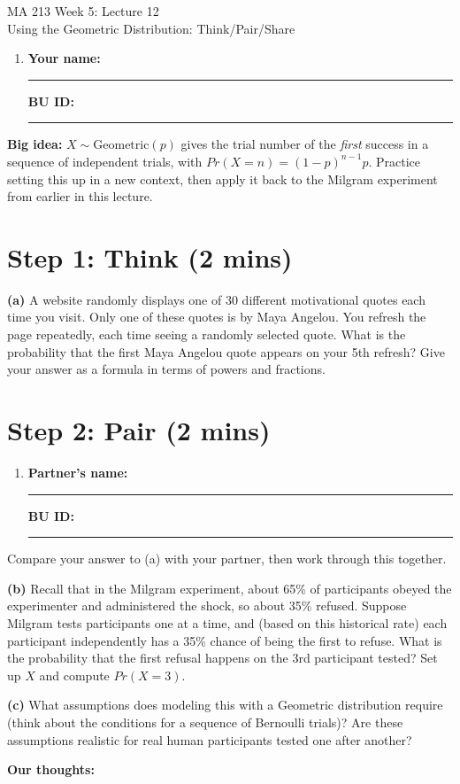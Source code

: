 \documentclass{article}
\newcommand{\coursenumber}{MA 213}
\newcommand{\weekplaceholder}{5}
\newcommand{\lectureplaceholder}{12}
\newcommand{\lecturetitle}{Using the Geometric Distribution: Think/Pair/Share}
\newcommand{\nameblank}{\rule{1.75in}{0.4pt}}
\newcommand{\idblank}{\rule{1.55in}{0.4pt}}
\begin{document}
\begin{center}
  {\LARGE \coursenumber{} Week \weekplaceholder{}: Lecture \lectureplaceholder{}}\\
  {\large \lecturetitle{}}
\end{center}

\begin{enumerate}[label=\arabic*.,leftmargin=*,itemsep=.7em]
  \item \textbf{Your name:} \nameblank \hfill \textbf{BU ID:} \idblank
\end{enumerate}

\textbf{Big idea:} $X \sim \text{Geometric}(p)$ gives the trial number of the \emph{first} success in a sequence of independent trials, with $Pr(X=n) = (1-p)^{n-1}p$. Practice setting this up in a new context, then apply it back to the Milgram experiment from earlier in this lecture.

\section*{Step 1: Think (2 mins)}

\textbf{(a)} A website randomly displays one of 30 different motivational quotes each time you visit. Only one of these quotes is by Maya Angelou. You refresh the page repeatedly, each time seeing a randomly selected quote. What is the probability that the first Maya Angelou quote appears on your 5th refresh? Give your answer as a formula in terms of powers and fractions.
\vspace{1.6in}

\newpage
\section*{Step 2: Pair (2 mins)}

\begin{enumerate}[label=\arabic*.,leftmargin=*,itemsep=.7em, start=2]
  \item \textbf{Partner's name:} \nameblank \hfill \textbf{BU ID:} \idblank
\end{enumerate}

Compare your answer to (a) with your partner, then work through this together.

\textbf{(b)} Recall that in the Milgram experiment, about 65\% of participants obeyed the experimenter and administered the shock, so about 35\% refused. Suppose Milgram tests participants one at a time, and (based on this historical rate) each participant independently has a 35\% chance of being the first to refuse. What is the probability that the first refusal happens on the 3rd participant tested? Set up $X$ and compute $Pr(X=3)$.
\vspace{0.7in}

\textbf{(c)} What assumptions does modeling this with a Geometric distribution require (think about the conditions for a sequence of Bernoulli trials)? Are these assumptions realistic for real human participants tested one after another?
\vspace{0.5in}

\textbf{Our thoughts:}
\vfill
\end{document}
